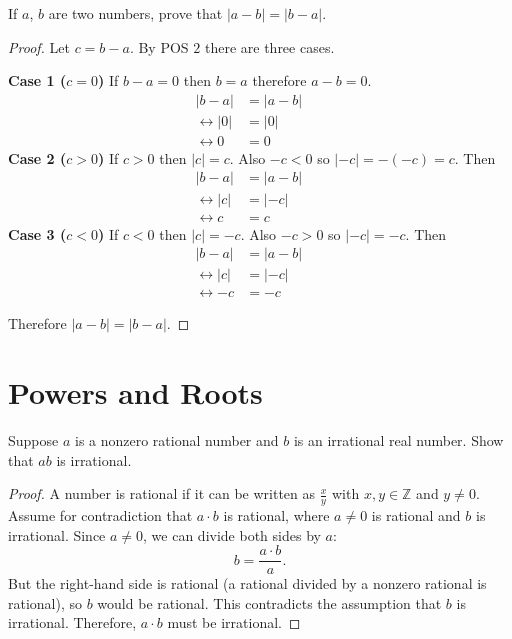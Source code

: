 \documentclass[6pt]{article}
\begin{document}
\begin{tcolorbox}[title=Problem 20, breakable]
    If $a$, $b$ are two numbers, prove that $|a - b| = |b - a|$.
\end{tcolorbox}

\begin{proof}
    Let $c = b - a$. By POS $2$ there are three cases.
    
    \textbf{Case 1 ($c = 0$)}
    If $b - a = 0$ then $b = a$ therefore $a - b = 0$.
    \begin{align*}
        |b - a| &= |a - b| && \\
        \leftrightarrow |0| &= |0| && \\
        \leftrightarrow 0 &= 0 
    \end{align*}
    \textbf{Case 2 ($c > 0$)}
    If $c > 0$ then $|c| = c$. Also $-c < 0$ so $|-c| = -(-c) = c$. Then
    \begin{align*}
        |b - a| &= |a - b| && \\
        \leftrightarrow |c| &= |-c| && \\
        \leftrightarrow c &= c
    \end{align*}
    \textbf{Case 3 ($c < 0$)}
    If $c < 0$ then $|c| = -c$. Also $-c > 0$ so $|-c| = -c$. Then
    \begin{align*}
        |b - a| &= |a - b| && \\
        \leftrightarrow |c| &= |-c| && \\
        \leftrightarrow -c &= -c
    \end{align*}

    Therefore $|a - b| = |b - a|$.
\end{proof}

\section{Powers and Roots}

\begin{tcolorbox}[title=Extra Problem, breakable]
    Suppose $a$ is a nonzero rational number and $b$ is an irrational real number.
    Show that $ab$ is irrational.
\end{tcolorbox}

\begin{proof}
    A number is rational if it can be written as $\frac{x}{y}$ with $x, y \in \mathbb{Z}$ and $y \neq 0$.  
    Assume for contradiction that $a \cdot b$ is rational, where $a \neq 0$ is rational and $b$ is irrational.  
    Since $a \neq 0$, we can divide both sides by $a$:  
    \[
        b = \frac{a \cdot b}{a}.
    \]  
    But the right-hand side is rational (a rational divided by a nonzero rational is rational), so $b$ would be rational.  
    This contradicts the assumption that $b$ is irrational.  
    Therefore, $a \cdot b$ must be irrational.
\end{proof}
\end{document}
